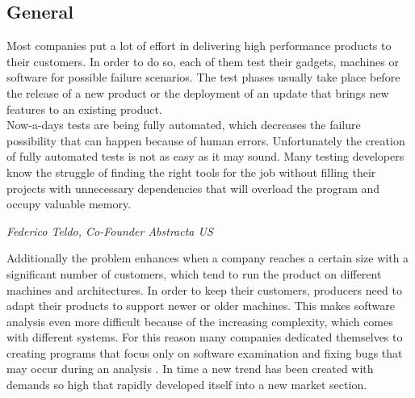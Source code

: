 \subsection{General}
Most companies put a lot of effort in delivering high performance products to their customers. In order to do so, each of them test their gadgets, machines or software for possible failure scenarios. The test phases usually take place before the release of a new product or the deployment of an update that brings new features to an existing product.\\
Now-a-days tests are being fully automated, which decreases the failure possibility that can happen because of human errors\cite{8389562}. Unfortunately the creation of fully automated tests is not as easy as it may sound. Many testing developers know the struggle of finding the right tools for the job without filling their projects with unnecessary dependencies that will overload the program and occupy valuable memory.
\begin{center}
	\begin{flushright}
		\textit{Federico Teldo, Co-Founder Abstracta US}
	\end{flushright}
\end{center}
Additionally the problem enhances when a company reaches a certain size with a significant number of customers, which tend to run the product on different machines and architectures. In order to keep their customers, producers need to adapt their products to support newer or older machines. This makes software analysis even more difficult because of the increasing complexity, which comes with different systems. For this reason many companies dedicated themselves to creating programs that focus only on software examination and fixing bugs that may occur during an analysis	. In time a new trend has been created with demands so high that rapidly developed itself into a new market section.\\
